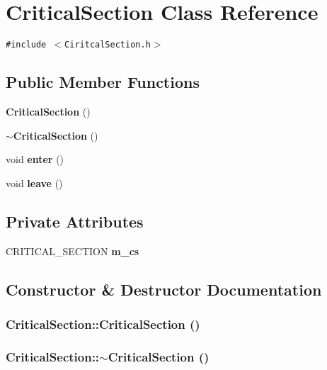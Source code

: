 \section{Critical\-Section Class Reference}
\label{class_critical_section}
{\tt \#include $<$Ciritcal\-Section.h$>$}

\subsection*{Public Member Functions}
\begin{CompactItemize}
\item 
{\bf Critical\-Section} ()
\item 
{\bf $\sim$Critical\-Section} ()
\item 
void {\bf enter} ()
\item 
void {\bf leave} ()
\end{CompactItemize}
\subsection*{Private Attributes}
\begin{CompactItemize}
\item 
CRITICAL\_\-SECTION {\bf m\_\-cs}
\end{CompactItemize}


\subsection{Constructor \& Destructor Documentation}
\subsubsection{\setlength{\rightskip}{0pt plus 5cm}Critical\-Section::Critical\-Section ()\hspace{0.3cm}{\tt  [inline]}}\label{class_critical_section_7749425577cdeee2d32815e63d96e9ff}


\subsubsection{\setlength{\rightskip}{0pt plus 5cm}Critical\-Section::$\sim$Critical\-Section ()\hspace{0.3cm}{\tt  [inline]}}\label{class_critical_section_8f10b99e9550811be81a0ca409171bcc}




